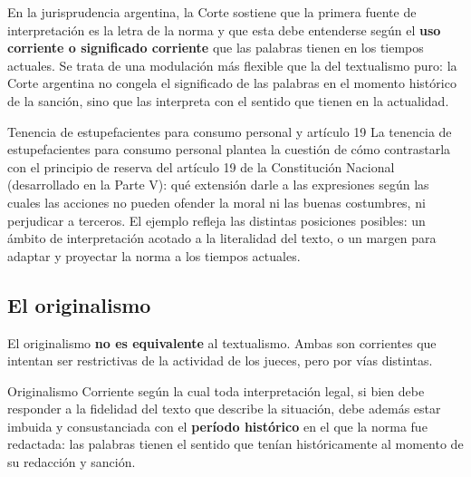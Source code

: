 \documentclass[12pt,oneside]{book}
\begin{document}
En la jurisprudencia argentina, la Corte sostiene que la primera fuente de interpretación es la letra de la norma y que esta debe entenderse según el \textbf{uso corriente o significado corriente} que las palabras tienen en los tiempos actuales. Se trata de una modulación más flexible que la del textualismo puro: la Corte argentina no congela el significado de las palabras en el momento histórico de la sanción, sino que las interpreta con el sentido que tienen en la actualidad.

\begin{example}{Tenencia de estupefacientes para consumo personal y artículo 19}
La tenencia de estupefacientes para consumo personal plantea la cuestión de cómo contrastarla con el principio de reserva del artículo 19 de la Constitución Nacional (desarrollado en la Parte V): qué extensión darle a las expresiones según las cuales las acciones no pueden ofender la moral ni las buenas costumbres, ni perjudicar a terceros. El ejemplo refleja las distintas posiciones posibles: un ámbito de interpretación acotado a la literalidad del texto, o un margen para adaptar y proyectar la norma a los tiempos actuales.
\end{example}

\subsection{El originalismo}

El originalismo \textbf{no es equivalente} al textualismo. Ambas son corrientes que intentan ser restrictivas de la actividad de los jueces, pero por vías distintas.

\begin{definition}{Originalismo}
Corriente según la cual toda interpretación legal, si bien debe responder a la fidelidad del texto que describe la situación, debe además estar imbuida y consustanciada con el \textbf{período histórico} en el que la norma fue redactada: las palabras tienen el sentido que tenían históricamente al momento de su redacción y sanción.
\end{definition}
\end{document}
